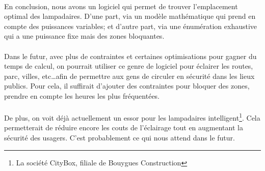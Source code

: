  \paragraph{} En conclusion, nous avons un logiciel qui permet de trouver l'emplacement optimal des lampadaires. D'une part, via un modèle mathématique qui prend en compte des puissances variables; et d'autre part, via une énumération exhaustive qui a une puissance fixe mais des zones bloquantes.

 \paragraph{} Dans le futur, avec plus de contraintes et certaines optimisations pour gagner du temps de calcul, on pourrait utiliser ce genre de logiciel pour éclairer les routes, parc, villes, etc\ldots afin de permettre aux gens de circuler en sécurité dans les lieux publics. Pour cela, il suffirait d'ajouter des contraintes pour bloquer des zones, prendre en compte les heures les plus fréquentées. 

 \paragraph{} De plus, on voit déjà actuellement un essor pour les lampadaires intelligent\footnote{La société CityBox, filiale de Bouygues Construction}. Cela permetterait de réduire encore les couts de l'éclairage tout en augmentant la sécurité des usagers. C'est probablement ce qui nous attend dans le futur.